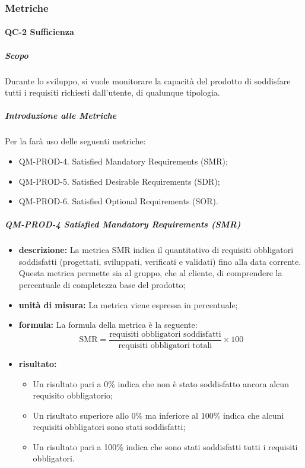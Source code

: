 		\subsubsection{Metriche}
				



		\paragraph{QC-2 Sufficienza}
			\subparagraph{Scopo}
			Durante lo sviluppo, si vuole monitorare la capacità del prodotto di soddisfare tutti i requisiti richiesti dall'utente, di qualunque tipologia.

			\subparagraph{Introduzione alle Metriche}
			Per la  farà uso delle seguenti metriche:

			\begin{itemize}
				\item QM-PROD-4. Satisfied Mandatory Requirements (SMR);
				\item QM-PROD-5. Satisfied Desirable Requirements (SDR);
				\item QM-PROD-6. Satisfied Optional Requirements (SOR).
			\end{itemize}

			\subparagraph{QM-PROD-4 Satisfied Mandatory Requirements (SMR)}

			\begin{itemize}
			 
				\item \textbf{descrizione: }
				La metrica SMR indica il quantitativo di requisiti obbligatori soddisfatti (progettati, sviluppati, verificati e validati) fino alla data corrente. Questa metrica permette sia al gruppo, che al cliente, di comprendere la percentuale di completezza base del prodotto;

				\item \textbf{unità di misura: }
				La metrica viene espressa in percentuale;

				\item \textbf{formula: }
				La formula della metrica è la seguente:
				\[
					\text{SMR} = \frac{\text{requisiti obbligatori soddisfatti}}{\text{requisiti obbligatori totali}} \times 100
				\]

				\item \textbf{risultato: }
				\begin{itemize}
					\item Un risultato pari a 0\% indica che non è stato soddisfatto ancora alcun requisito obbligatorio;
					\item Un risultato superiore allo 0\% ma inferiore al 100\% indica che alcuni requisiti obbligatori sono stati soddisfatti;
					\item Un risultato pari a 100\% indica che sono stati soddisfatti tutti i requisiti obbligatori.
				\end{itemize}

			\end{itemize}

